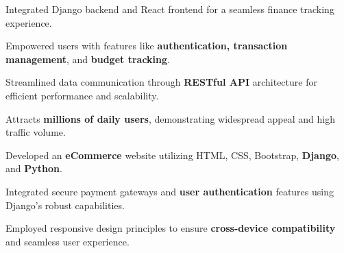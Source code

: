 \documentclass[]{deedy-resume-openfont}
\begin{document}
\begin{minipage}[t]{0.66\textwidth}
\vspace{\topsep} %
\begin{tightemize}
\item Integrated Django backend and React frontend for a seamless finance tracking experience.
\item Empowered users with features like \textbf{authentication, transaction} \textbf{management}, and \textbf{budget tracking}.
\item Streamlined data communication through \textbf{RESTful API} architecture for efficient performance and scalability.
\item Attracts \textbf{millions of daily users}, demonstrating widespread appeal and high traffic volume.



\end{tightemize}
\sectionsep



\vspace{\topsep} %
\begin{tightemize}
\item Developed an\textbf{ eCommerce} website utilizing HTML, CSS, Bootstrap, \textbf{Django}, and \textbf{Python}.
\item Integrated secure payment gateways and \textbf{user authentication} features using Django's robust capabilities.
\item Employed responsive design principles to ensure \textbf{cross-device compatibility} and seamless user experience.

\end{tightemize}
\sectionsep







\end{minipage}
\end{document}
